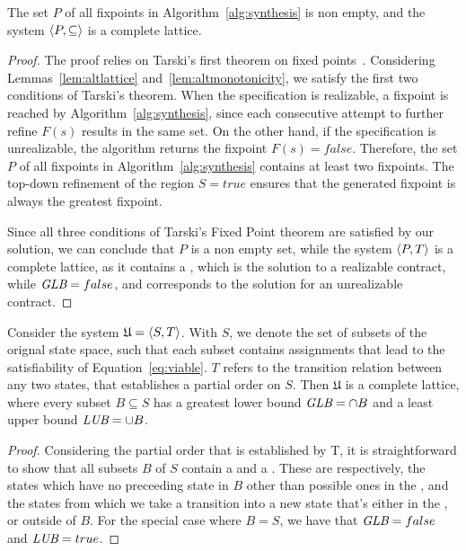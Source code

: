\begin{theorem}
The set $P$ of all fixpoints in Algorithm~\ref{alg:synthesis} is non
empty, and the system $\langle P, \subseteq \rangle$ is a complete lattice.
\label{thm:altfixpoint}
\end{theorem}
\begin{proof}
The proof relies on Tarski's first theorem on fixed
points~\cite{tarski1955lattice}.
Considering Lemmas~\ref{lem:altlattice} and~\ref{lem:altmonotonicity}, we satisfy the first two
conditions of Tarski's theorem. When the specification is realizable, a
fixpoint is reached by Algorithm~\ref{alg:synthesis}, since each consecutive
attempt to further refine $F(s)$ results in the same set. On the other hand, if
the specification is unrealizable, the algorithm returns the fixpoint $F(s) = false$. Therefore, the
set $P$ of all fixpoints in Algorithm~\ref{alg:synthesis} contains at least two
fixpoints. The top-down refinement of the region $S = true$ ensures that the generated fixpoint is always the greatest fixpoint.

Since all three conditions of Tarski's Fixed Point theorem are satisfied by our
solution, we can conclude that $P$ is a non empty set, while the system
$\langle P, T \rangle$ is a complete lattice, as it contains a \lub, which is
the solution to a realizable contract, while $\textit {GLB} = false$, and corresponds to
the solution for an unrealizable contract.
\end{proof}


\iffalse
\begin{lemma} Consider the system
$\mathfrak{U} = \langle S, T \rangle$. With $S$, we denote the set of
subsets of the orignal state space, such that each subset contains assignments that lead to the
satisfiability of Equation~\ref{eq:viable}. $T$ refers to the
transition relation between any two states, that establishes a partial order
on $S$. Then $\mathfrak{U}$ is a complete lattice, where every subset $B \subseteq
S$ has a greatest lower bound  $\textit {GLB} = \cap B$  and a least upper
bound $\textit {LUB} = \cup B$.
\label{lem:lattice}
\end{lemma}
\begin{proof}
Considering the partial order that is established by T, it is straightforward
to show that all subsets $B$ of $S$ contain a \glb and a \lub. These
are respectively, the states which have no preceeding state in $B$ other than
possible ones in the \glb, and the states from which we take a transition into
a new state that's either in the \lub, or outside of $B$. For the special case
where $B = S$, we have that $\textit {GLB} = false$ and $\textit {LUB} = true$.
\end{proof}

